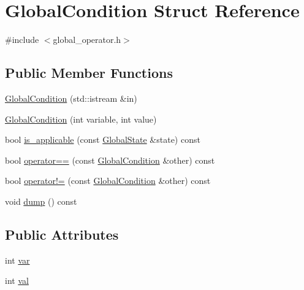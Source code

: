 \hypertarget{structGlobalCondition}{\section{Global\-Condition Struct Reference}
\label{structGlobalCondition}
}


{\ttfamily \#include $<$global\-\_\-operator.\-h$>$}

\subsection*{Public Member Functions}
\begin{DoxyCompactItemize}
\item 
\hyperlink{structGlobalCondition_a8e9f001b601903f074874594cc099913}{Global\-Condition} (std\-::istream \&in)
\item 
\hyperlink{structGlobalCondition_ae977a5daa5dbaae2fe90ac363088ca3a}{Global\-Condition} (int variable, int value)
\item 
bool \hyperlink{structGlobalCondition_ac16ac047b483b60a4313976d6b22044d}{is\-\_\-applicable} (const \hyperlink{classGlobalState}{Global\-State} \&state) const 
\item 
bool \hyperlink{structGlobalCondition_a3c1cc6b9f150485719591ceed92c34f4}{operator==} (const \hyperlink{structGlobalCondition}{Global\-Condition} \&other) const 
\item 
bool \hyperlink{structGlobalCondition_ac96bd1bbbf9b6a574d20dc6a0f44c43c}{operator!=} (const \hyperlink{structGlobalCondition}{Global\-Condition} \&other) const 
\item 
void \hyperlink{structGlobalCondition_a2f4f4a66e46af3caacd83c18c3d9c03d}{dump} () const 
\end{DoxyCompactItemize}
\subsection*{Public Attributes}
\begin{DoxyCompactItemize}
\item 
int \hyperlink{structGlobalCondition_a5bb1f42227d29c5d0512c8888e465525}{var}
\item 
int \hyperlink{structGlobalCondition_a8da4d55872038a4b85a5c9598bfbd6d8}{val}
\end{DoxyCompactItemize}


